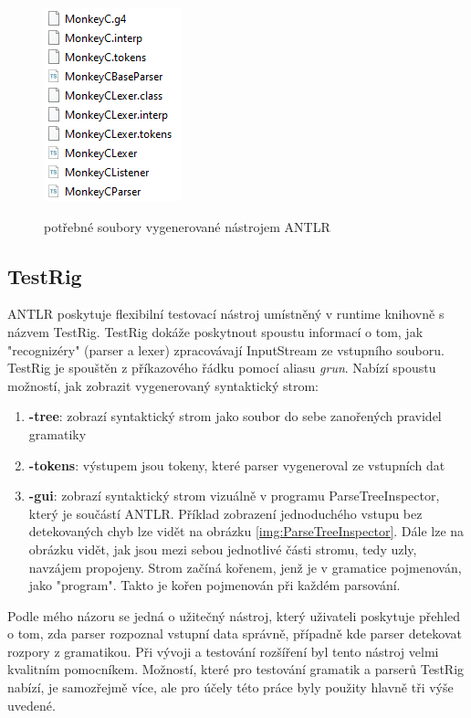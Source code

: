 \begin{figure}
	\centering
	\includegraphics{images/generated_files}
	\\
	\caption{potřebné soubory vygenerované nástrojem ANTLR}
	\label{img:generated_files}
\end{figure}

\subsection{TestRig}
ANTLR poskytuje flexibilní testovací nástroj umístněný v runtime knihovně s názvem TestRig. TestRig dokáže poskytnout spoustu informací o tom, jak "recognizéry" (parser a lexer) zpracovávají InputStream ze vstupního souboru. TestRig je spouštěn z příkazového řádku pomocí aliasu \emph{grun}. Nabízí spoustu možností, jak zobrazit vygenerovaný syntaktický strom:
\begin{enumerate}
\item \textbf{-tree}: zobrazí syntaktický strom jako soubor do sebe zanořených pravidel gramatiky
\item \textbf{-tokens}: výstupem jsou tokeny, které parser vygeneroval ze vstupních dat
\item \textbf{-gui}: zobrazí syntaktický strom vizuálně v programu ParseTreeInspector, který je součástí ANTLR. Příklad zobrazení jednoduchého vstupu bez detekovaných chyb lze vidět na obrázku \ref{img:ParseTreeInspector}. Dále lze na obrázku vidět, jak jsou mezi sebou jednotlivé části stromu, tedy uzly, navzájem propojeny. Strom začíná kořenem, jenž je v gramatice pojmenován, jako "program". Takto je kořen pojmenován při každém parsování. 
\end{enumerate}

Podle mého názoru se jedná o užitečný nástroj, který uživateli poskytuje přehled o tom, zda parser rozpoznal vstupní data správně, případně kde parser detekovat rozpory z gramatikou. Při vývoji a testování rozšíření byl tento nástroj velmi kvalitním pomocníkem. Možností, které pro testování gramatik a parserů TestRig nabízí, je samozřejmě více, ale pro účely této práce byly použity hlavně tři výše uvedené. 

